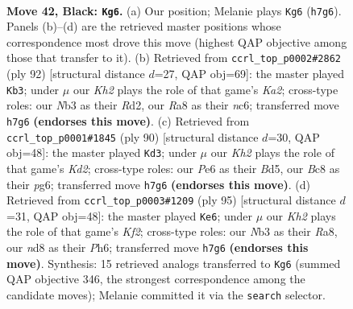 \documentclass[11pt]{article}
\begin{document}
\clearpage

\begin{figure}[p]\centering
\begin{subfigure}{0.46\textwidth}\centering
\resizebox{\linewidth}{!}{%
\newchessgame
\chessboard[
  setfen={r1bN4/7k/2P1p3/Pp1pB3/8/1nP2K2/8/7R b - - 7 42},
  showmover=false,
  pgfstyle=straightmove, color=movearrow, markmove={h7-g6}
]}
\caption{}
\end{subfigure}\hfill
\begin{subfigure}{0.46\textwidth}\centering
\resizebox{\linewidth}{!}{%
\newchessgame
\chessboard[
  setfen={r7/5p1k/2n5/2P1bN2/4P3/6p1/KP1R4/5B2 w - - 8 47},
  showmover=false,
  pgfstyle=straightmove, color=movearrow, markmove={a2-b3}
]}
\caption{}
\end{subfigure}
\\[4pt]
\begin{subfigure}{0.46\textwidth}\centering
\resizebox{\linewidth}{!}{%
\newchessgame
\chessboard[
  setfen={7R/8/6pp/1pkBp3/4P1bP/8/3K3r/4N3 w - - 3 46},
  showmover=false,
  pgfstyle=straightmove, color=movearrow, markmove={d2-d3}
]}
\caption{}
\end{subfigure}\hfill
\begin{subfigure}{0.46\textwidth}\centering
\resizebox{\linewidth}{!}{%
\newchessgame
\chessboard[
  setfen={r7/1R3k2/3P3p/2B3p1/2N2bPn/8/8/6K1 b - - 2 48},
  showmover=false,
  pgfstyle=straightmove, color=movearrow, markmove={f7-e6}
]}
\caption{}
\end{subfigure}
\caption{\textbf{Move 42, Black: \texttt{Kg6}.} (a) Our position; Melanie plays \texttt{Kg6} (\texttt{h7g6}). Panels (b)--(d) are the retrieved master positions whose correspondence most drove this move (highest QAP objective among those that transfer to it). (b) Retrieved from \texttt{ccrl\_top\_p0002\#2862} (ply 92) [structural distance $d$=27, QAP obj=69]: the master played \texttt{Kb3}; under $\mu$ our \emph{Kh2} plays the role of that game's \emph{Ka2}; cross-type roles: our \emph{N}b3 as their \emph{R}d2, our \emph{R}a8 as their \emph{n}c6; transferred move \texttt{h7g6} \textbf{(endorses this move)}. (c) Retrieved from \texttt{ccrl\_top\_p0001\#1845} (ply 90) [structural distance $d$=30, QAP obj=48]: the master played \texttt{Kd3}; under $\mu$ our \emph{Kh2} plays the role of that game's \emph{Kd2}; cross-type roles: our \emph{P}e6 as their \emph{B}d5, our \emph{B}c8 as their \emph{p}g6; transferred move \texttt{h7g6} \textbf{(endorses this move)}. (d) Retrieved from \texttt{ccrl\_top\_p0003\#1209} (ply 95) [structural distance $d$=31, QAP obj=48]: the master played \texttt{Ke6}; under $\mu$ our \emph{Kh2} plays the role of that game's \emph{Kf2}; cross-type roles: our \emph{N}b3 as their \emph{R}a8, our \emph{n}d8 as their \emph{P}h6; transferred move \texttt{h7g6} \textbf{(endorses this move)}. Synthesis: 15 retrieved analogs transferred to \texttt{Kg6} (summed QAP objective 346, the strongest correspondence among the candidate moves); Melanie committed it via the \texttt{search} selector.}
\label{fig:thought-m83}
\end{figure}
\end{document}
